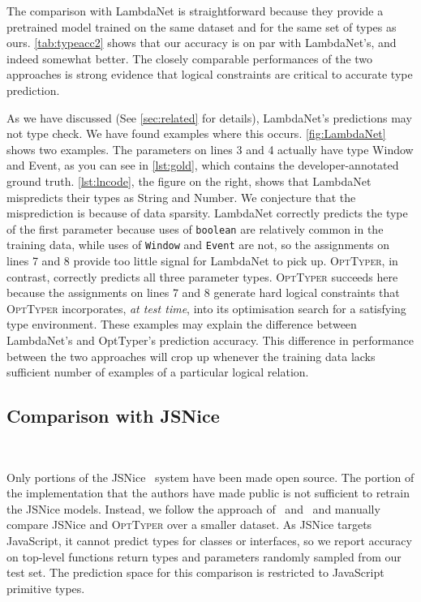 \documentclass[acmsmall, review, anonymous]{acmart}\settopmatter{printfolios=true,printccs=false,printacmref=false}
\newcommand{\projectname}{\textsc{OptTyper}\xspace}
\begin{document}
The comparison with LambdaNet is straightforward because they provide a pretrained model trained on the same dataset and for the same set of types as ours. 
\cref{tab:typeacc2} shows that our accuracy is on par with LambdaNet's, and indeed somewhat better.
The closely comparable performances of the two approaches is strong evidence that logical constraints are critical to accurate type prediction. 

As we have discussed (See \autoref{sec:related} for details), 
LambdaNet's predictions may not type check.  We have found examples where this occurs. \cref{fig:LambdaNet} shows two examples.  
The parameters on lines 3 and 4 actually have type Window and Event, as you can see in \cref{lst:gold}, which contains the developer-annotated ground truth.
\cref{lst:lncode}, the figure on the right, shows that LambdaNet mispredicts their types as String and Number.
%
We conjecture that the misprediction is because of data sparsity.
%
LambdaNet correctly predicts the type of the first parameter because uses of \texttt{boolean} are relatively common in the training data, while uses of \texttt{Window} and \texttt{Event} are not, so the assignments on lines 7 and 8 provide too little signal for LambdaNet to pick up.
\projectname, in contrast, correctly predicts all three parameter types.
\projectname succeeds here because the assignments on lines 7 and 8 generate hard logical constraints that \projectname incorporates, \emph{at test time}, into its optimisation search for a satisfying type environment.
These examples may explain the difference between LambdaNet's and OptTyper's prediction accuracy. 
This difference in performance between the two approaches will crop up whenever the training data lacks sufficient number of examples of a particular logical relation.


\subsection{Comparison with JSNice}~\label{}

Only portions of the JSNice~\cite{raychev15} system have been made open source. 
The portion of the implementation that the authors have made public is not sufficient to retrain the JSNice models. 
Instead, we follow the approach of~\citet{hellendoorn18} and~\citet{wei20} and manually compare JSNice and \projectname over a smaller dataset. 
As JSNice targets JavaScript, it cannot predict types for classes or interfaces, so we report accuracy on top-level functions return types and parameters randomly sampled from our test set. The prediction
space for this comparison is restricted to JavaScript primitive types.
\end{document}
